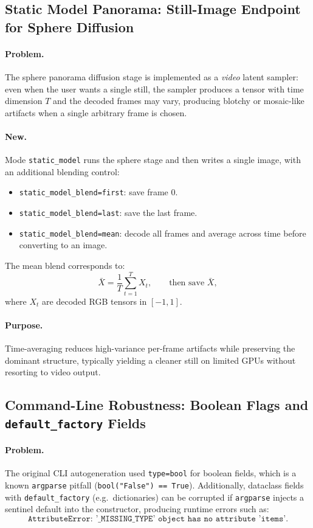 \documentclass[11pt,a4paper]{article}
\begin{document}
\subsection{Static Model Panorama: Still-Image Endpoint for Sphere Diffusion}

\paragraph{Problem.}
The sphere panorama diffusion stage is implemented as a \emph{video} latent sampler: even when the user wants a single still, the sampler produces a tensor with time dimension \(T\) and the decoded frames may vary, producing blotchy or mosaic-like artifacts when a single arbitrary frame is chosen.

\paragraph{New.}
Mode \texttt{static\_model} runs the sphere stage and then writes a single image, with an additional blending control:
\begin{itemize}[nosep]
    \item \texttt{static\_model\_blend=first}: save frame 0.
    \item \texttt{static\_model\_blend=last}: save the last frame.
    \item \texttt{static\_model\_blend=mean}: decode all frames and average across time before converting to an image.
\end{itemize}
The mean blend corresponds to:
\[
    \bar{X} = \frac{1}{T}\sum_{t=1}^{T} X_t,\qquad \text{then save }\bar{X},
\]
where \(X_t\) are decoded RGB tensors in \([-1,1]\).

\paragraph{Purpose.}
Time-averaging reduces high-variance per-frame artifacts while preserving the dominant structure, typically yielding a cleaner still on limited GPUs without resorting to video output.

\subsection{Command-Line Robustness: Boolean Flags and \texttt{default\_factory} Fields}

\paragraph{Problem.}
The original CLI autogeneration used \texttt{type=bool} for boolean fields, which is a known \texttt{argparse} pitfall (\texttt{bool("False") == True}).
Additionally, dataclass fields with \texttt{default\_factory} (e.g.\ dictionaries) can be corrupted if \texttt{argparse} injects a sentinel default into the constructor, producing runtime errors such as:
\[
    \texttt{AttributeError: '\_MISSING\_TYPE' object has no attribute 'items'}.
\]
\end{document}
